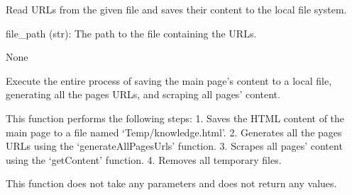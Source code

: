 \documentclass[letterpaper,10pt,english]{sphinxmanual}
\begin{document}

\begin{fulllineitems}
\label{\detokenize{Project.Script:Project.Script.RecupKbNETSKOPE.getContent}}
\pysigstartsignatures
{}
\pysigstopsignatures
\sphinxAtStartPar
Read URLs from the given file and saves their content to the local file system.
\begin{description}
\sphinxAtStartPar
file\_path (str): The path to the file containing the URLs.

\sphinxAtStartPar
None

\end{description}

\end{fulllineitems}


\begin{fulllineitems}
\label{\detokenize{Project.Script:Project.Script.RecupKbNETSKOPE.main}}
\pysigstartsignatures
{}
\pysigstopsignatures
\sphinxAtStartPar
Execute the entire process of saving the main page’s content to a local file, generating all the pages URLs, and scraping all pages’ content.

\sphinxAtStartPar
This function performs the following steps:
1. Saves the HTML content of the main page to a file named ‘Temp/knowledge.html’.
2. Generates all the pages URLs using the ‘generateAllPagesUrls’ function.
3. Scrapes all pages’ content using the ‘getContent’ function.
4. Removes all temporary files.

\sphinxAtStartPar
This function does not take any parameters and does not return any values.

\end{fulllineitems}

\end{document}
